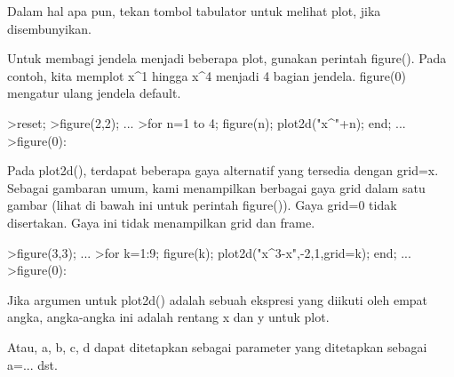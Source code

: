 \documentclass{article}
\begin{document}
\begin{eulernotebook}
\begin{eulercomment}
\begin{eulercomment}
\begin{eulercomment}
\begin{eulercomment}
\begin{eulercomment}
\begin{eulercomment}
\begin{eulercomment}
Dalam hal apa pun, tekan tombol tabulator untuk melihat plot, jika
disembunyikan.

Untuk membagi jendela menjadi beberapa plot, gunakan perintah
figure(). Pada contoh, kita memplot x\textasciicircum{}1 hingga x\textasciicircum{}4 menjadi 4 bagian
jendela. figure(0) mengatur ulang jendela default.
\end{eulercomment}
\begin{eulerprompt}
>reset;
>figure(2,2); ...
>for n=1 to 4; figure(n); plot2d("x^"+n); end; ...
>figure(0):
\end{eulerprompt}
\begin{eulercomment}
Pada plot2d(), terdapat beberapa gaya alternatif yang tersedia dengan
grid=x. Sebagai gambaran umum, kami menampilkan berbagai gaya grid
dalam satu gambar (lihat di bawah ini untuk perintah figure()). Gaya
grid=0 tidak disertakan. Gaya ini tidak menampilkan grid dan frame.
\end{eulercomment}
\begin{eulerprompt}
>figure(3,3); ...
>for k=1:9; figure(k); plot2d("x^3-x",-2,1,grid=k); end; ...
>figure(0):
\end{eulerprompt}
\begin{eulercomment}
Jika argumen untuk plot2d() adalah sebuah ekspresi yang diikuti oleh
empat angka, angka-angka ini adalah rentang x dan y untuk plot.

Atau, a, b, c, d dapat ditetapkan sebagai parameter yang ditetapkan
sebagai a=... dst.


\end{eulercomment}
\end{eulercomment}
\end{eulercomment}
\end{eulercomment}
\end{eulercomment}
\end{eulercomment}
\end{eulercomment}
\end{eulernotebook}
\end{document}
